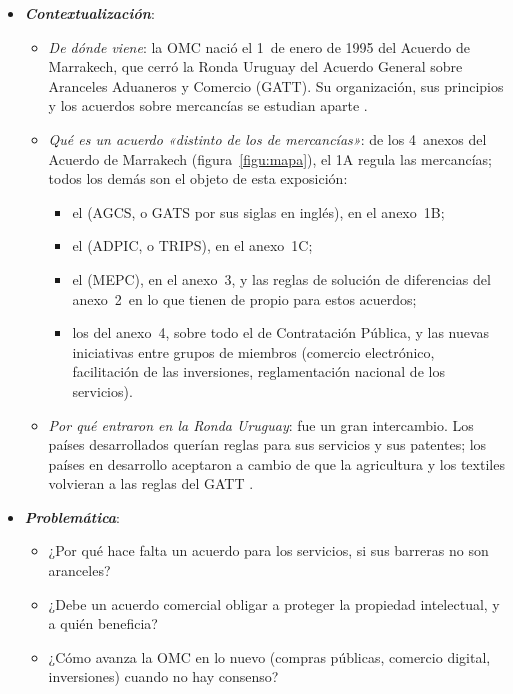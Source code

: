 \documentclass[11pt]{article}
\begin{document}
\begin{itemize}
\item \textbf{\emph{Contextualización}}:
  \begin{itemize}
  \item \emph{De dónde viene}: la OMC nació el 1~de enero de 1995 del Acuerdo de Marrakech, que cerró la Ronda Uruguay del Acuerdo General sobre Aranceles Aduaneros y Comercio (GATT). Su organización, sus principios y los acuerdos sobre mercancías se estudian aparte .
  \item \emph{Qué es un acuerdo «distinto de los de mercancías»}: de los 4~anexos del Acuerdo de Marrakech (figura~\ref{figu:mapa}), el 1A regula las mercancías; todos los demás son el objeto de esta exposición:
    \begin{itemize}
    \item el  (AGCS, o GATS por sus siglas en inglés), en el anexo~1B;
    \item el  (ADPIC, o TRIPS), en el anexo~1C;
    \item el  (MEPC), en el anexo~3, y las reglas de solución de diferencias del anexo~2~en lo que tienen de propio para estos acuerdos;
    \item los  del anexo~4, sobre todo el de Contratación Pública, y las nuevas iniciativas entre grupos de miembros (comercio electrónico, facilitación de las inversiones, reglamentación nacional de los servicios).
    \end{itemize}
  \item \emph{Por qué entraron en la Ronda Uruguay}: fue un gran intercambio. Los países desarrollados querían reglas para sus servicios y sus patentes; los países en desarrollo aceptaron a cambio de que la agricultura y los textiles volvieran a las reglas del GATT .
  \end{itemize}

\item \textbf{\emph{Problemática}}:
  \begin{itemize}
  \item ¿Por qué hace falta un acuerdo para los servicios, si sus barreras no son aranceles?
  \item ¿Debe un acuerdo comercial obligar a proteger la propiedad intelectual, y a quién beneficia?
  \item ¿Cómo avanza la OMC en lo nuevo (compras públicas, comercio digital, inversiones) cuando no hay consenso?
  \end{itemize}


\end{itemize}
\end{document}

